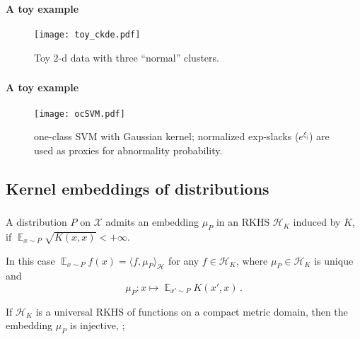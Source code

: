 \documentclass[t]{beamer}  %
\newcommand{\Xcal}{\mathcal{X}}
\newcommand{\Hcal}{\mathcal{H}}
\newcommand{\ex}{\mathop{\mathbb{E}}\nolimits}
\begin{document}
\begin{frame}[c]\frametitle{\insertsection}
  \framesubtitle{A toy example}
  \begin{figure}%
    \centering
    \texttt{[image: toy\_ckde.pdf]}
    \caption{Toy $2$-d data with three ``normal'' clusters.}
    \label{fig:toy}
  \end{figure}
\end{frame}

\begin{frame}[c]\frametitle{\insertsection}
  \framesubtitle{A toy example}
  \begin{figure}%
    \centering
    \texttt{[image: ocSVM.pdf]}
    \caption{one-class SVM with Gaussian kernel; normalized exp-slacks ($e^{\xi_i}$)
    are used as proxies for abnormality probability.}
    \label{fig:ocsvm}
  \end{figure}
\end{frame}

\subsection{Kernel embeddings of distributions} %
\label{sub:kernel_embeddings_of_distributions}

\begin{frame}[c]\frametitle{\insertsection}
  \framesubtitle{\insertsubsection}
  A distribution $P$ on $\Xcal$ admits an embedding $\mu_P$ in an RKHS $\Hcal_K$
  induced by $K$, if $\ex_{x\sim P} \sqrt{K(x,x)} < +\infty$.
  
  \vspace{\baselineskip}
  In this case $\ex_{x\sim P} f(x) = \langle f, \mu_P \rangle_\Hcal$ for any
  $f\in \Hcal_K$, where $\mu_P\in \Hcal_K$ is unique and
  $$ \mu_P: x \mapsto \ex_{x'\sim P} K(x', x) \,. $$
  
  \vspace{\baselineskip}
  If $\Hcal_K$ is a universal RKHS of functions on a compact metric domain, then
  the embedding $\mu_P$ is injective, \cite{gretton2012};
\end{frame}
\end{document}
